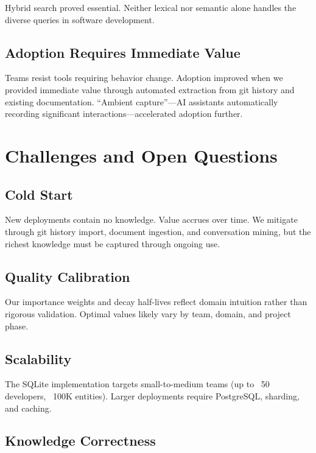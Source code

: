 \documentclass[10pt,journal,compsoc]{IEEEtran}
\begin{document}
Hybrid search proved essential. Neither lexical nor semantic alone handles the diverse queries in software development.

\subsection{Adoption Requires Immediate Value}

Teams resist tools requiring behavior change. Adoption improved when we provided immediate value through automated extraction from git history and existing documentation. ``Ambient capture''---AI assistants automatically recording significant interactions---accelerated adoption further.

\section{Challenges and Open Questions}

\subsection{Cold Start}

New deployments contain no knowledge. Value accrues over time. We mitigate through git history import, document ingestion, and conversation mining, but the richest knowledge must be captured through ongoing use.

\subsection{Quality Calibration}

Our importance weights and decay half-lives reflect domain intuition rather than rigorous validation. Optimal values likely vary by team, domain, and project phase.

\subsection{Scalability}

The SQLite implementation targets small-to-medium teams (up to ~50 developers, ~100K entities). Larger deployments require PostgreSQL, sharding, and caching.

\subsection{Knowledge Correctness}
\end{document}
